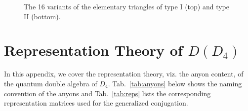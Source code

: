 \documentclass[two column]{article}
\newcommand{\caro}[1]{\textcolor{red}{[#1]}}
\begin{document}
\begin{figure}
\begin{tabular}{llll}
\end{tabular}\vspace{10pt}
\caption{The 16 variants of the elementary triangles of type I (top) and type II (bottom).}
\label{fig:al_trigs}
\end{figure}



\section{Representation Theory of $D(D_4)$}\label{app:reps}

In this appendix, we cover the representation theory, viz. the anyon content, of the quantum double algebra of $D_4$. Tab.~\ref{tab:anyons} below shows the naming convention of the anyons and Tab.~\ref{tab:reps} lists the corresponding representation matrices used for the generalized conjugation.
\end{document}
